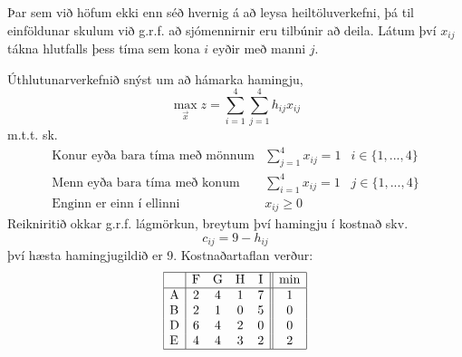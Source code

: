 \begin{lausn}Þar sem við höfum ekki enn séð hvernig á að leysa heiltöluverkefni, þá til einföldunar skulum við g.r.f. að sjómennirnir eru tilbúnir að deila. Látum því $x_{ij}$ tákna hlutfalls þess tíma sem kona $i$ eyðir með manni $j$.

Úthlutunarverkefnið snýst um að hámarka hamingju, 
$$ \max_{\vec{x}} z=\sum_{i=1}^4\sum_{j=1}^4 h_{ij}x_{ij}$$
m.t.t. sk.
\[\begin{array}{lcc}
\textrm{Konur eyða bara tíma með mönnum}  & \sum_{j=1}^4 x_{ij}=1 & i\in\{1,...,4\}\\
\textrm{Menn eyða bara tíma með konum}  & \sum_{i=1}^4 x_{ij}=1 & j\in\{1,...,4\}\\
\textrm{Enginn er einn í ellinni} & x_{ij}\geq 0   
  \end{array}\]
Reikniritið okkar g.r.f. lágmörkun, breytum því hamingju í kostnað skv. $$c_{ij}=9-h_{ij}$$ því hæsta hamingjugildið er 9. Kostnaðartaflan verður:
\[ \begin{array}{|l|cccc||c|}\hline & \textrm{F} & \textrm{G} & \textrm{H} & \textrm{I} & \min\\ \hline
    \textrm{A} & 2 & 4 & 1 & 7 & 1\\
    \textrm{B} & 2 & 1 & 0 & 5 & 0\\
    \textrm{D} & 6 & 4 & 2 & 0 & 0\\
    \textrm{E} & 4 & 4 & 3 & 2 & 2 \\ \hline 
   \end{array}\]


\end{lausn}
